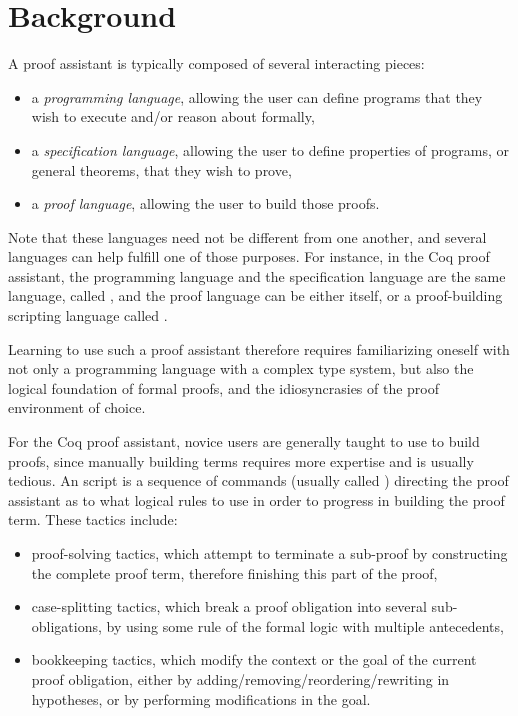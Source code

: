 \section{Background}

A proof assistant is typically composed of several interacting pieces:

\begin{itemize}

  \item a \emph{programming language}, allowing the user can define programs
that they wish to execute and/or reason about formally,

  \item a \emph{specification language}, allowing the user to define properties
of programs, or general theorems, that they wish to prove,

  \item a \emph{proof language}, allowing the user to build those proofs.

\end{itemize}

Note that these languages need not be different from one another, and several
languages can help fulfill one of those purposes.  For instance, in the Coq
proof assistant, the programming language and the specification language are the
same language, called \Gallina{}, and the proof language can be either
\Gallina{} itself, or a proof-building scripting language called \Ltac{}.

Learning to use such a proof assistant therefore requires familiarizing oneself
with not only a programming language with a complex type system, but also the
logical foundation of formal proofs, and the idiosyncrasies of the proof
environment of choice.

For the Coq proof assistant, novice users are generally taught to use \Ltac{} to
build proofs, since manually building \Gallina{} terms requires more expertise
and is usually tedious.  An \Ltac{} script is a sequence of commands (usually
called ) directing the proof assistant as to what logical rules
to use in order to progress in building the proof term.  These tactics include:

\begin{itemize}

  \item proof-solving tactics, which attempt to terminate a sub-proof by
constructing the complete proof term, therefore finishing this part of the
proof,

  \item case-splitting tactics, which break a proof obligation into several
sub-obligations, by using some rule of the formal logic with multiple
antecedents,

  \item bookkeeping tactics, which modify the context or the goal of the current
proof obligation, either by adding/removing/reordering/rewriting in hypotheses,
or by performing modifications in the goal.

\end{itemize}

